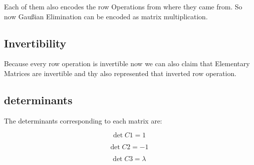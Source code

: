 Each of them also encodes the row Operations from where they came from.
So now Gaußian Elimination can be encoded as matrix multiplication.

\subsection{Invertibility}

Because every row operation is invertible now we can also claim that
Elementary Matrices are invertible and thy also represented that inverted row operation.


\subsection{determinants}

The determinants corresponding to each matrix are:

\[\det C1 = 1\]

\[\det C2 = -1\]

\[\det C3 = \lambda\]
